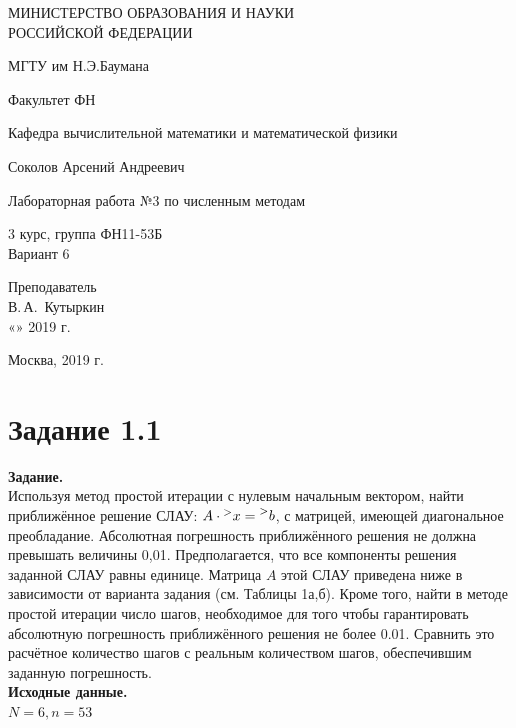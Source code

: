 \documentclass[14pt,a4paper]{scrartcl}
\begin{document}
	\begin{titlepage}
	\begin{center}
		\large
		МИНИСТЕРСТВО ОБРАЗОВАНИЯ И НАУКИ\\ РОССИЙСКОЙ ФЕДЕРАЦИИ
		
		\vspace{0.5cm}
		
		МГТУ им Н.Э.Баумана
		\vspace{0.25cm}
		
		Факультет ФН
		
		Кафедра вычислительной математики и математической физики
		\vfill
		
		
		Соколов Арсений Андреевич\\
		\vfill
		
		
		{\LARGE Лабораторная работа №3 по численным методам\\[2mm]
		}
		\bigskip
		
		3 курс, группа ФН11-53Б\\
		Вариант 6
	\end{center}
	\vfill
	
	\newlength{\ML}
	\hfill\begin{minipage}{0.4\textwidth}
		Преподаватель\\
		\underline{\hspace{3cm}} В.\,А.~Кутыркин\\
		«\underline{\hspace{0.7cm}}» \underline{\hspace{1.71cm}} 2019 г.
	\end{minipage}%
	\bigskip
	
	
	\vfill
	
	\begin{center}
		Москва, 2019 г.
	\end{center}
\end{titlepage}

\section*{Задание 1.1}
\textbf{Задание.}\\
Используя метод простой итерации с нулевым начальным вектором, найти приближённое решение СЛАУ: $A \cdot \prescript{>}{}{x} = \prescript{>}{}{b}$, с матрицей, имеющей диагональное преобладание. Абсолютная погрешность
приближённого решения не должна превышать величины 0,01. Предполагается, что все компоненты решения заданной СЛАУ равны единице. Матрица $A$ этой СЛАУ приведена ниже в зависимости от варианта задания (см. Таблицы 1а,б). Кроме того, найти в методе простой итерации число шагов, необходимое для того чтобы гарантировать абсолютную погрешность приближённого решения не более 0.01. Сравнить это расчётное количество шагов с реальным количеством шагов, обеспечившим заданную погрешность.\\
\textbf{Исходные данные.}\\
$N = 6, n = 53$
\end{document}
